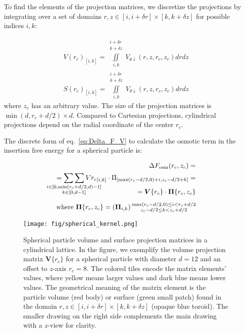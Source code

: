\documentclass[10pt, a4paper]{article}
\begin{document}
\begin{multicols}{2}
To find the elements of the projection matrices, we discretize the projections by integrating over a set of domains $r, z \in [i, i + \delta r] \times [k, k + \delta z]$ for possible indices $i, k$:

\begin{eqnarray}
    V(r_c)_{[i, k]} = \iint \limits_{i, k}^{\substack{i+\delta r\\ k+\delta z}} V_{\theta \downarrow} (r, z, r_c, z_c) dr dz
    \\
    S(r_c)_{[i, k]} = \iint \limits_{i, k}^{\substack{i+\delta r\\ k+\delta z}} V_{\theta \downarrow} (r, z, r_c, z_c) dr dz
\end{eqnarray}
where $z_c$ has an arbitrary value.
The size of the projection matrices is $\min(d, r_c + d/2) \times d$.
Compared to Cartesian projections, cylindrical projections depend on the radial coordinate of the center $r_c$.

The discrete form of eq.~\ref{eq:Delta_F_V} to calculate the osmotic term in the insertion free energy for a spherical particle is:

\begin{eqnarray}
    \begin{split}
        \Delta F_{\textrm{osm}}(r_c, z_c) =\\
        = \mathop{\sum\sum}_{\mathclap{\substack{i \in [0, \min(r_c+d/2,d)-1] \\ k \in [0, d-1]}}} V{r_c}_{[i, k]} \cdot \Pi_{[\max(r_c-d/2,0)+i, z_c-d/2+k]} =\\[-15pt]
        = \bm{V}\{r_c\} \cdot \bm{\Pi}\{r_c, z_c\} \\[5pt]
        \text{where } \bm{\Pi}\{r_c,z_c\} =\left(\bm{\Pi}_{i,k}\right) {\substack{\max(r_c-d/2,0) \le i < r_c+d/2 \\ z_c-d/2 \le k < z_c+d/2}}
    \end{split}
\end{eqnarray}

\begin{figure}[H]
    \centering
    \texttt{[image: fig/spherical\_kernel.png]}
    \caption{
        Spherical particle volume and surface projection matrices in a cylindrical lattice.
        In the figure, we exemplify the volume projection matrix $\bm{V}\{r_c\}$ for a spherical particle with diameter $d = 12$ and an offset to $z$-axis $r_c= 8$.
        The colored tiles encode the matrix elements' values, where yellow means larger values and dark blue means lower values.
        The geometrical meaning of the matrix element is the particle volume (red body) or surface (green small patch) found in the domain $r,z \in [i, i + \delta r] \times [k, k + \delta z]$ (opaque blue toroid).
        The smaller drawing on the right side complements the main drawing with a $z$-view for clarity.
    }
    \label{fig:spherical_kernel}
\end{figure}


\end{multicols}
\end{document}
